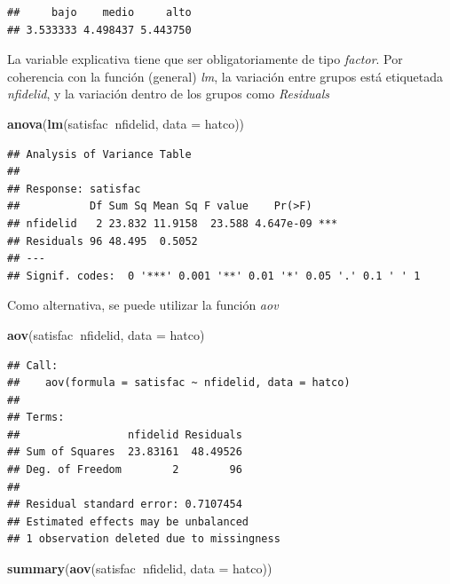 \documentclass[]{book}
\newenvironment{Shaded}{\begin{snugshade}}{\end{snugshade}}
\newcommand{\KeywordTok}[1]{\textcolor[rgb]{0.13,0.29,0.53}{\textbf{#1}}}
\newcommand{\DataTypeTok}[1]{\textcolor[rgb]{0.13,0.29,0.53}{#1}}
\newcommand{\OperatorTok}[1]{\textcolor[rgb]{0.81,0.36,0.00}{\textbf{#1}}}
\newcommand{\NormalTok}[1]{#1}
\begin{document}
\begin{verbatim}
##     bajo    medio     alto 
## 3.533333 4.498437 5.443750
\end{verbatim}

La variable explicativa tiene que ser obligatoriamente de tipo
\emph{factor}. Por coherencia con la función (general) \emph{lm}, la
variación entre grupos está etiquetada \emph{nfidelid}, y la variación
dentro de los grupos como \emph{Residuals}

\begin{Shaded}
\begin{Highlighting}[]
\KeywordTok{anova}\NormalTok{(}\KeywordTok{lm}\NormalTok{(satisfac}\OperatorTok{~}\NormalTok{nfidelid, }\DataTypeTok{data =}\NormalTok{ hatco))}
\end{Highlighting}
\end{Shaded}

\begin{verbatim}
## Analysis of Variance Table
## 
## Response: satisfac
##           Df Sum Sq Mean Sq F value    Pr(>F)    
## nfidelid   2 23.832 11.9158  23.588 4.647e-09 ***
## Residuals 96 48.495  0.5052                      
## ---
## Signif. codes:  0 '***' 0.001 '**' 0.01 '*' 0.05 '.' 0.1 ' ' 1
\end{verbatim}

Como alternativa, se puede utilizar la función \emph{aov}

\begin{Shaded}
\begin{Highlighting}[]
\KeywordTok{aov}\NormalTok{(satisfac}\OperatorTok{~}\NormalTok{nfidelid, }\DataTypeTok{data =}\NormalTok{ hatco)}
\end{Highlighting}
\end{Shaded}

\begin{verbatim}
## Call:
##    aov(formula = satisfac ~ nfidelid, data = hatco)
## 
## Terms:
##                 nfidelid Residuals
## Sum of Squares  23.83161  48.49526
## Deg. of Freedom        2        96
## 
## Residual standard error: 0.7107454
## Estimated effects may be unbalanced
## 1 observation deleted due to missingness
\end{verbatim}

\begin{Shaded}
\begin{Highlighting}[]
\KeywordTok{summary}\NormalTok{(}\KeywordTok{aov}\NormalTok{(satisfac}\OperatorTok{~}\NormalTok{nfidelid, }\DataTypeTok{data =}\NormalTok{ hatco))}
\end{Highlighting}
\end{Shaded}
\end{document}
